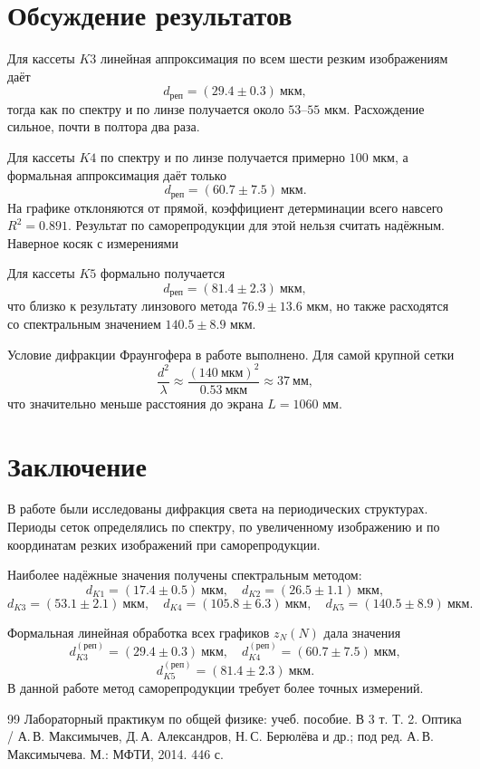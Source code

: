\documentclass[twoside]{mfitjournal}
\begin{document}
\section*{Обсуждение результатов}

Для кассеты $K3$ линейная аппроксимация по всем шести резким изображениям даёт
\[
d_{\text{реп}} = (29.4 \pm 0.3)\ \text{мкм},
\]
тогда как по спектру и по линзе получается около $53$--$55$ мкм. Расхождение сильное, почти в полтора два раза.

Для кассеты $K4$ по спектру и по линзе получается примерно $100$ мкм, а формальная аппроксимация даёт только
\[
d_{\text{реп}} = (60.7 \pm 7.5)\ \text{мкм}.
\]
На графике отклоняются от прямой, коэффициент детерминации всего навсего $R^2 = 0.891$. Результат по саморепродукции для этой нельзя считать надёжным. Наверное косяк с измерениями

Для кассеты $K5$ формально получается
\[
d_{\text{реп}} = (81.4 \pm 2.3)\ \text{мкм},
\]
что близко к результату линзового метода $76.9 \pm 13.6$ мкм, но также расходятся со спектральным значением $140.5 \pm 8.9$ мкм.

Условие дифракции Фраунгофера в работе выполнено. Для самой крупной сетки
\[
\frac{d^2}{\lambda} \approx \frac{(140\ \text{мкм})^2}{0.53\ \text{мкм}} \approx 37\ \text{мм},
\]
что значительно меньше расстояния до экрана $L=1060$ мм.

\section*{Заключение}

В работе были исследованы дифракция света на периодических структурах. Периоды сеток определялись по спектру, по увеличенному изображению и по координатам резких изображений при саморепродукции.

Наиболее надёжные значения получены спектральным методом:
\[
d_{K1} = (17.4 \pm 0.5)\ \text{мкм},\quad
d_{K2} = (26.5 \pm 1.1)\ \text{мкм},
\]
\[
d_{K3} = (53.1 \pm 2.1)\ \text{мкм},\quad
d_{K4} = (105.8 \pm 6.3)\ \text{мкм},\quad
d_{K5} = (140.5 \pm 8.9)\ \text{мкм}.
\]

Формальная линейная обработка всех графиков $z_N(N)$ дала значения
\[
d_{K3}^{(\text{реп})} = (29.4 \pm 0.3)\ \text{мкм},\quad
d_{K4}^{(\text{реп})} = (60.7 \pm 7.5)\ \text{мкм},
\]
\[
d_{K5}^{(\text{реп})} = (81.4 \pm 2.3)\ \text{мкм}.
\]
В данной работе метод саморепродукции требует более точных измерений.

\begin{thebibliography}{99}
Лабораторный практикум по общей физике: учеб. пособие. В 3 т. Т. 2. Оптика / А.\,В. Максимычев, Д.\,А. Александров, Н.\,С. Берюлёва и др.; под ред. А.\,В. Максимычева. М.: МФТИ, 2014. 446 с.
\end{thebibliography}
\end{document}
